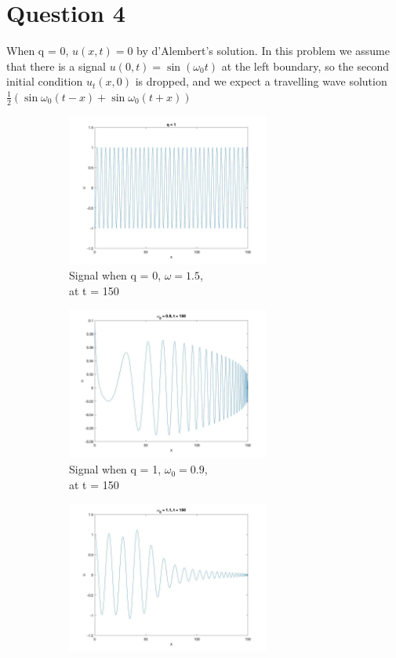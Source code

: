 \documentclass[a4paper,11pt]{article}
\begin{document}
\section{Question 4}
When q = 0, $u(x,t) = 0$ by d'Alembert's solution. In this problem we assume that there is a signal $u(0,t) = \sin(\omega_0 t)$ at the left boundary, so the second initial condition $u_t(x,0)$ is dropped, and we expect a travelling wave solution $\frac{1}{2}(\sin\omega_0 (t-x)+\sin\omega_0(t+x))$
\begin{figure}[H]
\begin{subfigure}{0.5\textwidth}
 \includegraphics[width = \linewidth, height =5cm]{Q4(0).jpg}
 \caption{Signal when q = 0, $\omega = 1.5$, \\at t = 150}
 \label{Q4(a)}
 \end{subfigure}
 \begin{subfigure}{0.5\textwidth}
 \includegraphics[width = \linewidth, height =5cm]{Q4(1).jpg}
 \caption{Signal when q = 1, $\omega_0 = 0.9$, \\at t = 150}
 \label{Q4(b)}
 \end{subfigure}
  \begin{subfigure}{0.5\textwidth}
 \includegraphics[width = \linewidth, height =5cm]{Q4(2).jpg}

\end{subfigure}
\end{figure}
\end{document}
